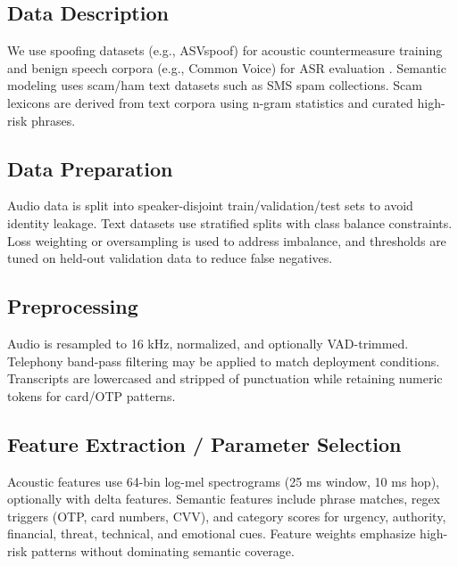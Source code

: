 \documentclass[11pt,a4paper]{article}
\begin{document}
\subsection{Data Description}
We use spoofing datasets (e.g., ASVspoof) for acoustic countermeasure training and benign speech corpora (e.g., Common Voice) for ASR evaluation \cite{asvspoof2019,commonvoice2019}. Semantic modeling uses scam/ham text datasets such as SMS spam collections. Scam lexicons are derived from text corpora using n-gram statistics and curated high-risk phrases.

\subsection{Data Preparation}
Audio data is split into speaker-disjoint train/validation/test sets to avoid identity leakage. Text datasets use stratified splits with class balance constraints. Loss weighting or oversampling is used to address imbalance, and thresholds are tuned on held-out validation data to reduce false negatives.

\subsection{Preprocessing}
Audio is resampled to 16 kHz, normalized, and optionally VAD-trimmed. Telephony band-pass filtering may be applied to match deployment conditions. Transcripts are lowercased and stripped of punctuation while retaining numeric tokens for card/OTP patterns.

\subsection{Feature Extraction / Parameter Selection}
Acoustic features use 64-bin log-mel spectrograms (25 ms window, 10 ms hop), optionally with delta features. Semantic features include phrase matches, regex triggers (OTP, card numbers, CVV), and category scores for urgency, authority, financial, threat, technical, and emotional cues. Feature weights emphasize high-risk patterns without dominating semantic coverage.
\end{document}
